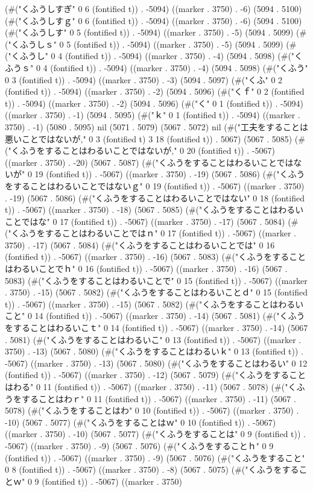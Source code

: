{{(#("くふうしすぎ" 0 6 (fontified t)) . -5094) ((marker . 3750) . -6) (5094 . 5100) (#("くふうしすｇ" 0 6 (fontified t)) . -5094) ((marker . 3750) . -6) (5094 . 5100) (#("くふうしす" 0 5 (fontified t)) . -5094) ((marker . 3750) . -5) (5094 . 5099) (#("くふうしｓ" 0 5 (fontified t)) . -5094) ((marker . 3750) . -5) (5094 . 5099) (#("くふうし" 0 4 (fontified t)) . -5094) ((marker . 3750) . -4) (5094 . 5098) (#("くふうｓ" 0 4 (fontified t)) . -5094) ((marker . 3750) . -4) (5094 . 5098) (#("くふう" 0 3 (fontified t)) . -5094) ((marker . 3750) . -3) (5094 . 5097) (#("くふ" 0 2 (fontified t)) . -5094) ((marker . 3750) . -2) (5094 . 5096) (#("くｆ" 0 2 (fontified t)) . -5094) ((marker . 3750) . -2) (5094 . 5096) (#("く" 0 1 (fontified t)) . -5094) ((marker . 3750) . -1) (5094 . 5095) (#("ｋ" 0 1 (fontified t)) . -5094) ((marker . 3750) . -1) (5080 . 5095) nil (5071 . 5079) (5067 . 5072) nil (#("工夫をすることは悪いことではないが," 0 3 (fontified t) 3 18 (fontified t)) . 5067) (5067 . 5085) (#("くふうをすることはわるいことではないが," 0 20 (fontified t)) . -5067) ((marker . 3750) . -20) (5067 . 5087) (#("くふうをすることはわるいことではないが" 0 19 (fontified t)) . -5067) ((marker . 3750) . -19) (5067 . 5086) (#("くふうをすることはわるいことではないｇ" 0 19 (fontified t)) . -5067) ((marker . 3750) . -19) (5067 . 5086) (#("くふうをすることはわるいことではない" 0 18 (fontified t)) . -5067) ((marker . 3750) . -18) (5067 . 5085) (#("くふうをすることはわるいことではな" 0 17 (fontified t)) . -5067) ((marker . 3750) . -17) (5067 . 5084) (#("くふうをすることはわるいことではｎ" 0 17 (fontified t)) . -5067) ((marker . 3750) . -17) (5067 . 5084) (#("くふうをすることはわるいことでは" 0 16 (fontified t)) . -5067) ((marker . 3750) . -16) (5067 . 5083) (#("くふうをすることはわるいことでｈ" 0 16 (fontified t)) . -5067) ((marker . 3750) . -16) (5067 . 5083) (#("くふうをすることはわるいことで" 0 15 (fontified t)) . -5067) ((marker . 3750) . -15) (5067 . 5082) (#("くふうをすることはわるいことｄ" 0 15 (fontified t)) . -5067) ((marker . 3750) . -15) (5067 . 5082) (#("くふうをすることはわるいこと" 0 14 (fontified t)) . -5067) ((marker . 3750) . -14) (5067 . 5081) (#("くふうをすることはわるいこｔ" 0 14 (fontified t)) . -5067) ((marker . 3750) . -14) (5067 . 5081) (#("くふうをすることはわるいこ" 0 13 (fontified t)) . -5067) ((marker . 3750) . -13) (5067 . 5080) (#("くふうをすることはわるいｋ" 0 13 (fontified t)) . -5067) ((marker . 3750) . -13) (5067 . 5080) (#("くふうをすることはわるい" 0 12 (fontified t)) . -5067) ((marker . 3750) . -12) (5067 . 5079) (#("くふうをすることはわる" 0 11 (fontified t)) . -5067) ((marker . 3750) . -11) (5067 . 5078) (#("くふうをすることはわｒ" 0 11 (fontified t)) . -5067) ((marker . 3750) . -11) (5067 . 5078) (#("くふうをすることはわ" 0 10 (fontified t)) . -5067) ((marker . 3750) . -10) (5067 . 5077) (#("くふうをすることはｗ" 0 10 (fontified t)) . -5067) ((marker . 3750) . -10) (5067 . 5077) (#("くふうをすることは" 0 9 (fontified t)) . -5067) ((marker . 3750) . -9) (5067 . 5076) (#("くふうをすることｈ" 0 9 (fontified t)) . -5067) ((marker . 3750) . -9) (5067 . 5076) (#("くふうをすること" 0 8 (fontified t)) . -5067) ((marker . 3750) . -8) (5067 . 5075) (#("くふうをすることｗ" 0 9 (fontified t)) . -5067) ((marker . 3750) }}
